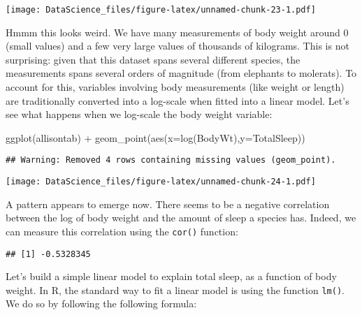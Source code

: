 \documentclass[
]{book}
\newenvironment{Shaded}{\begin{snugshade}}{\end{snugshade}}
\newcommand{\AttributeTok}[1]{\textcolor[rgb]{0.77,0.63,0.00}{#1}}
\newcommand{\FunctionTok}[1]{\textcolor[rgb]{0.00,0.00,0.00}{#1}}
\newcommand{\NormalTok}[1]{#1}
\newcommand{\SpecialCharTok}[1]{\textcolor[rgb]{0.00,0.00,0.00}{#1}}
\newcommand{\StringTok}[1]{\textcolor[rgb]{0.31,0.60,0.02}{#1}}
\begin{document}
\texttt{[image: DataScience\_files/figure-latex/unnamed-chunk-23-1.pdf]}

Hmmm this looks weird. We have many measurements of body weight around 0 (small values) and a few very large values of thousands of kilograms. This is not surprising: given that this dataset spans several different species, the measurements spans several orders of magnitude (from elephants to molerats). To account for this, variables involving body measurements (like weight or length) are traditionally converted into a log-scale when fitted into a linear model. Let's see what happens when we log-scale the body weight variable:

\begin{Shaded}
\begin{Highlighting}[]
\FunctionTok{ggplot}\NormalTok{(allisontab) }\SpecialCharTok{+} \FunctionTok{geom\_point}\NormalTok{(}\FunctionTok{aes}\NormalTok{(}\AttributeTok{x=}\FunctionTok{log}\NormalTok{(BodyWt),}\AttributeTok{y=}\NormalTok{TotalSleep))}
\end{Highlighting}
\end{Shaded}

\begin{verbatim}
## Warning: Removed 4 rows containing missing values (geom_point).
\end{verbatim}

\texttt{[image: DataScience\_files/figure-latex/unnamed-chunk-24-1.pdf]}

A pattern appears to emerge now. There seems to be a negative correlation between the log of body weight and the amount of sleep a species has. Indeed, we can measure this correlation using the \texttt{cor()} function:

\begin{Shaded}
\end{Shaded}

\begin{verbatim}
## [1] -0.5328345
\end{verbatim}

Let's build a simple linear model to explain total sleep, as a function of body weight. In R, the standard way to fit a linear model is using the function \texttt{lm()}. We do so by following the following formula:
\end{document}
